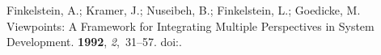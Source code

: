 \documentclass[jsan,article,accept,moreauthors,pdftex]{Definitions/mdpi}
\begin{document}
\begin{thebibliography}{999}
Finkelstein, A.; Kramer, J.; Nuseibeh, B.; Finkelstein, L.; Goedicke, M.
\newblock Viewpoints: {A} Framework for Integrating Multiple Perspectives in
  System Development.
 {\bf 1992}, {\em 2},~31--57.
\newblock
  doi:{\href{https://doi.org/10.1142/S0218194092000038}{}}.

\end{thebibliography}


%






\end{document}
